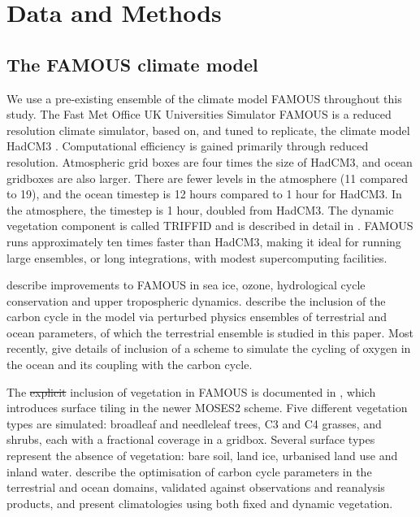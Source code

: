 \documentclass[esd, article]{copernicus} %
\providecommand{\DIFdel}[1]{{\protect\color{red}\sout{#1}}}                      %
\providecommand{\DIFdelbegin}{} %
\providecommand{\DIFdelend}{} %
\begin{document}
\section{Data and Methods}\label{sec:dataandmethods}

\subsection{The FAMOUS climate model}\label{subsec:FAMOUS}

We use a pre-existing ensemble of the climate model FAMOUS throughout this study. The Fast Met Office UK Universities Simulator FAMOUS \citep{jones2005systematic,smith2008famous} is a reduced resolution climate simulator, based on, and tuned to replicate, the climate model HadCM3 \citep{gordon2000simulation,pope2000impact}. Computational efficiency is gained primarily through reduced resolution. Atmospheric grid boxes are four times the size of HadCM3, and ocean gridboxes are also larger. There are fewer levels in the atmosphere (11 compared to 19), and the ocean timestep is 12 hours compared to 1 hour for HadCM3. In the atmosphere, the timestep is 1 hour, doubled from HadCM3. The dynamic vegetation component is called TRIFFID and is described in detail in \cite{cox2001description}.  FAMOUS runs approximately ten times faster than HadCM3, making it ideal for running large ensembles, or long integrations, with modest supercomputing facilities.

\cite{smith2012famous} describe improvements to FAMOUS in sea ice, ozone, hydrological cycle conservation and upper tropospheric dynamics. \cite{williams2013optimising} describe the inclusion of the carbon cycle in the model via perturbed physics ensembles of terrestrial and ocean parameters, of which the terrestrial ensemble is studied in this paper. Most recently, \cite{williams2014oxygen} give details of inclusion of a scheme to simulate the cycling of oxygen in the ocean and its coupling with the carbon cycle.

The \DIFdelbegin \DIFdel{explicit }\DIFdelend inclusion of vegetation in FAMOUS is documented in \cite{williams2013optimising}, which introduces surface tiling in the newer MOSES2 scheme. Five different vegetation types are simulated: broadleaf and needleleaf trees, C3 and C4 grasses, and shrubs, each with a fractional coverage in a gridbox. Several surface types represent the absence of vegetation: bare soil, land ice, urbanised land use and inland water. \cite{williams2013optimising} describe the optimisation of carbon cycle parameters in the terrestrial and ocean domains, validated against observations and reanalysis products, and present climatologies using both fixed and dynamic vegetation.  
\end{document}
